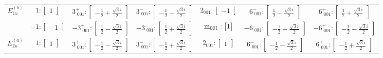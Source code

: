 \documentclass[fleqn,8pt,landscape]{jsarticle}
\begin{document}
\begin{longtable}{ccccccc}
$ E_{1u}^{(b)} $ & $ 1:\begin{bmatrix} 1 \end{bmatrix} $ & $ 3^{+}_{\,\,001}:\begin{bmatrix} - \frac{1}{2} + \frac{\sqrt{3} i}{2} \end{bmatrix} $ & $ 3^{-}_{\,\,001}:\begin{bmatrix} - \frac{1}{2} - \frac{\sqrt{3} i}{2} \end{bmatrix} $ & $ 2{}_{001}:\begin{bmatrix} -1 \end{bmatrix} $ & $ 6^{-}_{\,\,001}:\begin{bmatrix} \frac{1}{2} - \frac{\sqrt{3} i}{2} \end{bmatrix} $ & $ 6^{+}_{\,\,001}:\begin{bmatrix} \frac{1}{2} + \frac{\sqrt{3} i}{2} \end{bmatrix} $ \\
& $ -1:\begin{bmatrix} -1 \end{bmatrix} $ & $ -3^{+}_{\,\,001}:\begin{bmatrix} \frac{1}{2} - \frac{\sqrt{3} i}{2} \end{bmatrix} $ & $ -3^{-}_{\,\,001}:\begin{bmatrix} \frac{1}{2} + \frac{\sqrt{3} i}{2} \end{bmatrix} $ & $ {\rm m}_{001}:\begin{bmatrix} 1 \end{bmatrix} $ & $ -6^{-}_{\,\,001}:\begin{bmatrix} - \frac{1}{2} + \frac{\sqrt{3} i}{2} \end{bmatrix} $ & $ -6^{+}_{\,\,001}:\begin{bmatrix} - \frac{1}{2} - \frac{\sqrt{3} i}{2} \end{bmatrix} $ \\ \hline
$ E_{2u}^{(a)} $ & $ 1:\begin{bmatrix} 1 \end{bmatrix} $ & $ 3^{+}_{\,\,001}:\begin{bmatrix} - \frac{1}{2} - \frac{\sqrt{3} i}{2} \end{bmatrix} $ & $ 3^{-}_{\,\,001}:\begin{bmatrix} - \frac{1}{2} + \frac{\sqrt{3} i}{2} \end{bmatrix} $ & $ 2{}_{001}:\begin{bmatrix} 1 \end{bmatrix} $ & $ 6^{-}_{\,\,001}:\begin{bmatrix} - \frac{1}{2} - \frac{\sqrt{3} i}{2} \end{bmatrix} $ & $ 6^{+}_{\,\,001}:\begin{bmatrix} - \frac{1}{2} + \frac{\sqrt{3} i}{2} \end{bmatrix} $ \\

\end{longtable}
\end{document}
